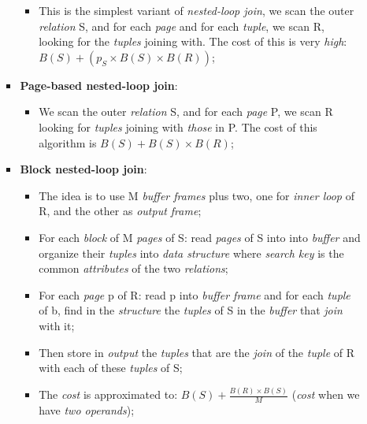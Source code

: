 \documentclass{article}
\begin{document}
\begin{itemize}
\begin{itemize}
\begin{itemize}
\begin{itemize}
\item This is the simplest variant of \emph{nested-loop join}, we scan the outer \emph{relation} S, and for each \emph{page} and for each \emph{tuple}, we scan R, looking for the \emph{tuples} joining with. The cost of this is very \emph{high}: $B(S) + (p_S \times B(S) \times B(R))$;
\end{itemize}
\item \textbf{Page-based nested-loop join}:
\begin{itemize}
\item We scan the outer \emph{relation} S, and for each \emph{page} P, we scan R looking for \emph{tuples} joining with \emph{those} in P. The cost of this algorithm is $B(S)+B(S) \times B(R)$;
\end{itemize}
\item \textbf{Block nested-loop join}:
\begin{itemize}
\item The idea is to use M \emph{buffer frames} plus two, one for \emph{inner loop} of R, and the other as \emph{output frame};
\item For each \emph{block} of M \emph{pages} of S: read \emph{pages} of S into into \emph{buffer} and organize their \emph{tuples} into \emph{data structure} where \emph{search key} is the common \emph{attributes} of the two \emph{relations};
\item For each \emph{page} p of R: read p into \emph{buffer frame} and for each \emph{tuple} of b, find in the \emph{structure} the \emph{tuples} of S in the \emph{buffer} that \emph{join} with it;
\item Then store in \emph{output} the \emph{tuples} that are the \emph{join} of the \emph{tuple} of R with each of these \emph{tuples} of S; 
\item The \emph{cost} is approximated to: $B(S) + \frac{B(R) \times B(S)}{M}$ (\emph{cost} when we have \emph{two operands});
\end{itemize}
\end{itemize}
\end{itemize}
\end{itemize}
\clearpage
\end{document}
